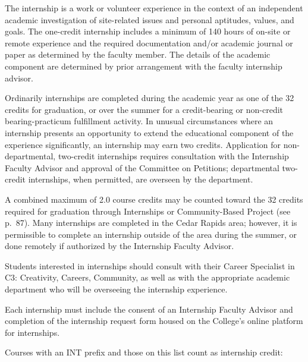 \documentclass[
  letterpaper,
]{scrbook}
\begin{document}
The internship is a work or volunteer experience in the context of an
independent academic investigation of site-related issues and personal
aptitudes, values, and goals. The one-credit internship includes a
minimum of 140 hours of on-site or remote experience and the required
documentation and/or academic journal or paper as determined by the
faculty member. The details of the academic component are determined by
prior arrangement with the faculty internship advisor.

Ordinarily internships are completed during the academic year as one of
the 32 credits for graduation, or over the summer for a credit-bearing
or non-credit bearing-practicum fulfillment activity. In unusual
circumstances where an internship presents an opportunity to extend the
educational component of the experience significantly, an internship may
earn two credits. Application for non-departmental, two-credit
internships requires consultation with the Internship Faculty Advisor
and approval of the Committee on Petitions; departmental two-credit
internships, when permitted, are overseen by the department.

A combined maximum of 2.0 course credits may be counted toward the 32
credits required for graduation through Internships or Community-Based
Project (see p.~87). Many internships are completed in the Cedar Rapids
area; however, it is permissible to complete an internship outside of
the area during the summer, or done remotely if authorized by the
Internship Faculty Advisor.

Students interested in internships should consult with their Career
Specialist in C3: Creativity, Careers, Community, as well as with the
appropriate academic department who will be overseeing the internship
experience.

Each internship must include the consent of an Internship Faculty
Advisor and completion of the internship request form housed on the
College's online platform for internships.

Courses with an INT prefix and those on this list count as internship
credit:
\end{document}
